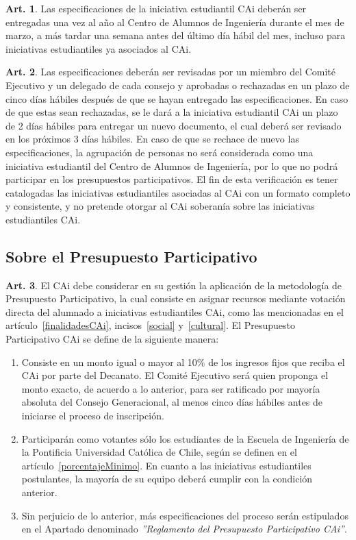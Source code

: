 \documentclass[letterpaper,11pt]{article}
\theoremstyle{definition}%
\newtheorem{art}{Art.} %
\begin{document}
\begin{art}
	Las especificaciones de la iniciativa estudiantil CAi deberán ser entregadas una vez al año al Centro de Alumnos de Ingeniería durante el mes de marzo, a más tardar una semana antes del último día hábil del mes, incluso para iniciativas estudiantiles ya asociados al CAi.
\end{art}

\begin{art}
	Las especificaciones deberán ser revisadas por un miembro del Comité Ejecutivo y un delegado de cada consejo y aprobadas o rechazadas en un plazo de cinco días hábiles después de que se hayan entregado las especificaciones. En caso de que estas sean rechazadas, se le dará a la iniciativa estudiantil CAi un plazo de 2 días hábiles para entregar un nuevo documento, el cual deberá ser revisado en los próximos 3 días hábiles. En caso de que se rechace de nuevo las especificaciones, la agrupación de personas no será considerada como una iniciativa estudiantil del Centro de Alumnos de Ingeniería, por lo que no podrá participar en los presupuestos participativos. El fin de esta verificación es tener catalogadas las iniciativas estudiantiles asociadas al CAi con un formato completo y consistente, y no pretende otorgar al CAi soberanía sobre las iniciativas estudiantiles CAi.
\end{art}


\subsection*{Sobre el Presupuesto Participativo}

\begin{art}\label{definicionPParticipativo1}
	El CAi debe considerar en su gestión la aplicación de la metodología de Presupuesto Participativo, la cual consiste en asignar recursos mediante votación directa del alumnado a iniciativas estudiantiles CAi, como las mencionadas en el artículo~\ref{finalidadesCAi}, incisos~\ref{social} y~\ref{cultural}. El Presupuesto Participativo CAi se define de la siguiente manera:
	\begin{enumerate}
		\item Consiste en un monto igual o mayor al 10\% de los ingresos fijos que reciba el CAi por parte del Decanato. El Comité Ejecutivo será quien proponga el monto exacto, de acuerdo a lo anterior, para ser ratificado por mayoría absoluta del Consejo Generacional, al menos cinco días hábiles antes de iniciarse el proceso de inscripción.
		\item Participarán como votantes sólo los estudiantes de la Escuela de Ingeniería de la Pontificia Universidad Católica de Chile, según se definen en el artículo~\ref{porcentajeMinimo}. En cuanto a las iniciativas estudiantiles postulantes, la mayoría de su equipo deberá cumplir con la condición anterior.
		\item Sin perjuicio de lo anterior, más especificaciones del proceso serán estipulados en el Apartado denominado \textit{''Reglamento del Presupuesto Participativo CAi''}.
	\end{enumerate}
\end{art}
\end{document}
